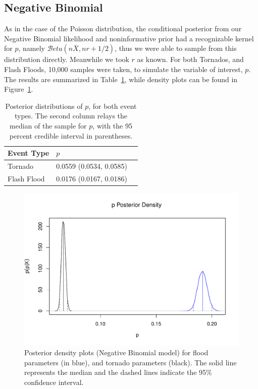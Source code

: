\documentclass{article}\usepackage[]{graphicx}\usepackage[]{color}
\begin{document}
\subsection{Negative Binomial}
\label{ss:rNBinom}

As in the case of the Poisson distribution, the conditional posterior from our Negative Binomial likelihood and noninformative prior had a recognizable kernel for $p$, namely $\mathcal{B}eta(n\bar{X},nr+1/2)$, thus we were able to sample from this distribution directly. Meanwhile we took $r$ as known. For both Tornados, and Flash Floods, 10,000 samples were taken, to simulate the variable of interest, $p$. The results are summarized in Table~\ref{t:rNB}, while density plots can be found in Figure~\ref{f:nbdensity}.

\begin{table}
    \centering
    \caption{Posterior distributions of $p$, for both event types. The second column relays the median of the sample for $p$, with the 95 percent credible interval in parentheses.}
    \label{t:rNB}
    \begin{tabular}{| l | l | l |}
    \hline
    Event Type & $p$  \\ \hline
    Tornado & 0.0559 (0.0534, 0.0585) \\ \hline
    Flash Flood & 0.0176 (0.0167, 0.0186) \\ \hline
    \end{tabular}
\end{table}

\begin{figure}[p]
\centering
\includegraphics[width=.65\textwidth]{figure/NB_Density.pdf}
\caption{Posterior density plots (Negative Binomial model) for flood parameters (in blue), and tornado parameters (black). The solid line represents the median and the dashed lines indicate the 95\% confidence interval.}
\label{f:nbdensity}
\end{figure}
\end{document}

